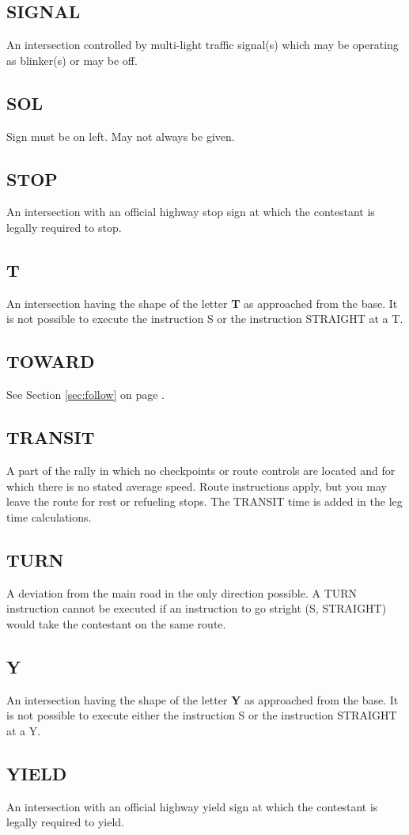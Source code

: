 \subsection{SIGNAL}
An intersection controlled by multi-light traffic signal(s) which may be operating as blinker(s) or may be off.

\subsection{SOL}
Sign must be on left.  May not always be given.

\subsection{STOP}
An intersection with an official highway stop sign at which the contestant is legally required to stop.

\subsection{T}
An intersection having the shape of the letter \textbf{T} as approached from the base.  It is not possible to execute the instruction S or the instruction STRAIGHT at a T.

\subsection{TOWARD}
See Section \ref{sec:follow} on page \pageref{sec:follow}.

\subsection{TRANSIT}
A part of the rally in which no checkpoints or route controls are located and for which there is no stated average speed.  Route instructions apply, but you may leave the route for rest or refueling stops.  The TRANSIT time is added in the leg time calculations.

\subsection{TURN}
A deviation from the main road in the only direction possible.  A TURN instruction cannot be executed if an instruction to go stright (S, STRAIGHT) would take the contestant on the same route.

\subsection{Y}
An intersection having the shape of the letter \textbf{Y} as approached from the base.  It is not possible to execute either the instruction S or the instruction STRAIGHT at a Y.

\subsection{YIELD}
An intersection with an official highway yield sign at which the contestant is legally required to yield.
